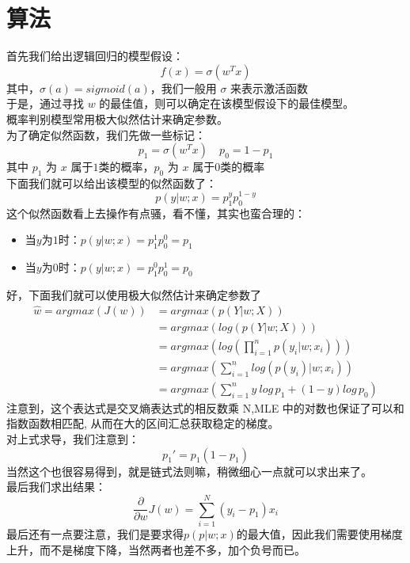 \documentclass{report}
\begin{document}
\section{算法}
首先我们给出逻辑回归的模型假设：
$$
f(x)=\sigma(w^Tx)
$$
其中，$\sigma(a)=sigmoid(a)$，我们一般用 $\sigma$ 来表示激活函数\\
于是，通过寻找 $w$ 的最佳值，则可以确定在该模型假设下的最佳模型。\\
概率判别模型常用极大似然估计来确定参数。\\
为了确定似然函数，我们先做一些标记：
$$
p_1=\sigma(w^Tx) \quad p_0=1-p_1
$$
其中 $p_1$ 为 $x$ 属于$1$类的概率，$p_0$ 为 $x$ 属于$0$类的概率\\
下面我们就可以给出该模型的似然函数了：
$$
p(y|w;x)=p_1^yp_0^{1-y}
$$
这个似然函数看上去操作有点骚，看不懂，其实也蛮合理的：
\begin{itemize}
	\item 当$y$为$1$时：$p(y|w;x)=p_1^1p_0^0=p_1$
	\item 当$y$为$0$时：$p(y|w;x)=p_1^0p_0^1=p_0$
\end{itemize}
好，下面我们就可以使用极大似然估计来确定参数了
\begin{equation}
\begin{aligned}
\hat{w}=argmax(J(w))&=argmax(p(Y|w;X))\\
&=argmax(log(p(Y|w;X)))\\
&=argmax(log(\prod_{i=1}^n p(y_i|w;x_i)))\\
&=argmax(\sum_{i=1}^n log(p(y_i)|w;x_i))\\
&=argmax(\sum_{i=1}^n y\ log\, p_1+(1-y)log\,p_0)
\end{aligned}
\end{equation}
注意到，这个表达式是交叉熵表达式的相反数乘 N,MLE 中的对数也保证了可以和指数函数相匹配, 从而在大的区间汇总获取稳定的梯度。\\
对上式求导，我们注意到：
$$
p_1'=p_1(1-p_1)
$$
当然这个也很容易得到，就是链式法则嘛，稍微细心一点就可以求出来了。\\
最后我们求出结果：
$$
\frac{\partial}{\partial w}J(w)=\sum_{i=1}^{N}\left(y_{i}-p_{1}\right) x_{i}
$$
最后还有一点要注意，我们是要求得$p(p|w;x)$的最大值，因此我们需要使用梯度上升，而不是梯度下降，当然两者也差不多，加个负号而已。
\end{document}
